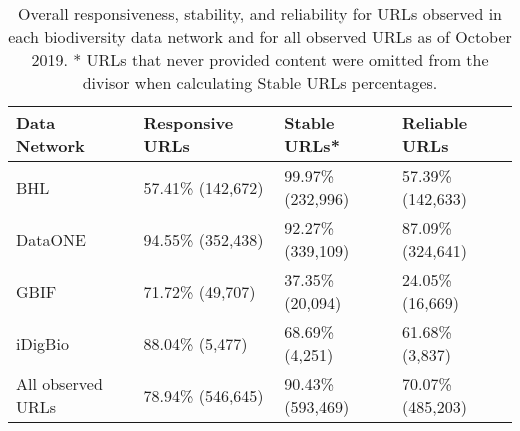 \begin{table}[!ht]
\begin{adjustwidth}{0in}{0in} %
\centering
\begin{tabular}{llll}
\hline
{\bf Data Network} & {\bf Responsive URLs} & {\bf Stable URLs*} & {\bf Reliable URLs} \\ \hline
BHL & 57.41\% (142,672) & 99.97\% (232,996) & 57.39\% (142,633) \\ 
DataONE & 94.55\% (352,438) & 92.27\% (339,109) & 87.09\% (324,641) \\ 
GBIF & 71.72\% (49,707) & 37.35\% (20,094) & 24.05\% (16,669) \\ 
iDigBio & 88.04\% (5,477) & 68.69\% (4,251) & 61.68\% (3,837)  \\ 
All observed URLs & 78.94\% (546,645) & 90.43\% (593,469) & 70.07\% (485,203) \\ \hline
\end{tabular}
\caption{Overall responsiveness, stability, and reliability for URLs observed in each biodiversity data network and for all observed URLs as of October 2019. 
* URLs that never provided content were omitted from the divisor when calculating Stable URLs percentages.
}
\label{table1}
\end{adjustwidth}
\end{table}




